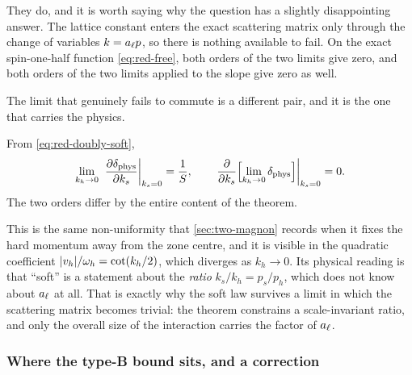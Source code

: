 They do, and it is worth saying why the question has a slightly disappointing
answer. The lattice constant enters the exact scattering matrix only through the
change of variables $k=a_{\ell} p$, so there is nothing available to fail. On
the exact spin-one-half function \eqref{eq:red-free}, both orders of the two
limits give zero, and both orders of the two limits applied to the slope give
zero as well.

The limit that genuinely fails to commute is a different pair, and it is the one
that carries the physics.

\begin{observation}
\label{obs:soft-hard-noncommute}
From \eqref{eq:red-doubly-soft},
\begin{equation}
  \lim_{k_h\to0}\;
  \left.\frac{\partial\delta_{\mathrm{phys}}}{\partial k_s}\right|_{k_s=0}
  =\frac1S,
  \qquad
  \left.\frac{\partial}{\partial k_s}
  \Bigl[\lim_{k_h\to0}\delta_{\mathrm{phys}}\Bigr]\right|_{k_s=0}=0 .
  \label{eq:red-noncommute}
\end{equation}
The two orders differ by the entire content of the theorem.
\end{observation}

\noindent This is the same non-uniformity that \cref{sec:two-magnon} records
when it fixes the hard momentum away from the zone centre, and it is visible in
the quadratic coefficient $\lvert v_h\rvert/\omega_h=\cot(k_h/2)$, which diverges as
$k_h\to0$. Its physical reading is that ``soft'' is a statement about the
\emph{ratio} $k_s/k_h=p_s/p_h$, which does not know about $a_{\ell}$ at all.
That is exactly why the soft law survives a limit in which the scattering matrix
becomes trivial: the theorem constrains a scale-invariant ratio, and only the
overall size of the interaction carries the factor of $a_{\ell}$.

\subsubsection*{Where the type-B bound sits, and a correction}

